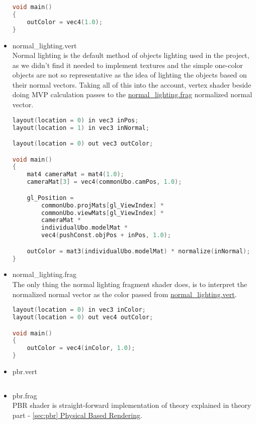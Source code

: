 \begin{itemize}
\begin{lstlisting}[language=c++, caption=Light cube fragment shader(./assets/shaders/light\_cube.frag)]
void main()
{
    outColor = vec4(1.0);
}
\end{lstlisting}
    \item normal\_lighting.vert\\
    \label{vert_normal_light}
    Normal lighting is the default method of objects lighting used in the project, as we didn't find it needed to implement textures and the simple one-color objects are not so representative as the idea of lighting the objects based on their normal vectors. Taking all of this into the account, vertex shader beside doing MVP calculation passes to the \hyperref[frag_normal_light]{normal\_lighting.frag} normalized normal vector.
\begin{lstlisting}[language=c++, caption=Normal lighting vertex shader(./assets/shaders/normal\_lighting.vert)]
layout(location = 0) in vec3 inPos;
layout(location = 1) in vec3 inNormal;

layout(location = 0) out vec3 outColor;

void main()
{
    mat4 cameraMat = mat4(1.0);
    cameraMat[3] = vec4(commonUbo.camPos, 1.0);

    gl_Position =
        commonUbo.projMats[gl_ViewIndex] *
        commonUbo.viewMats[gl_ViewIndex] *
        cameraMat *
        individualUbo.modelMat *
        vec4(pushConst.objPos + inPos, 1.0);

    outColor = mat3(individualUbo.modelMat) * normalize(inNormal);
}
\end{lstlisting}
    \item normal\_lighting.frag\\
    The only thing the normal lighting fragment shader does, is to interpret the normalized normal vector as the color passed from \hyperref[vert_normal_light]{normal\_lighting.vert}.
    \label{frag_normal_light}
\begin{lstlisting}[language=c++, caption=Normal lighting fragment shader(./assets/shaders/normal\_lighting.frag)]
layout(location = 0) in vec3 inColor;
layout(location = 0) out vec4 outColor;

void main()
{
    outColor = vec4(inColor, 1.0);
}
\end{lstlisting}
    \item pbr.vert\\
\begin{lstlisting}[language=c++, caption=PBR vertex shader(./assets/shaders/pbr.vert)]
\end{lstlisting}
    \item pbr.frag\\
    PBR shader is straight-forward implementation of theory explained in theory part - \hyperref[sec:pbr]{\ref*{sec:pbr} Physical Based Rendering}.
\begin{lstlisting}[language=c++, caption=PBR fragment shader(./assets/shaders/pbr.frag)]
\end{lstlisting}
\end{itemize}